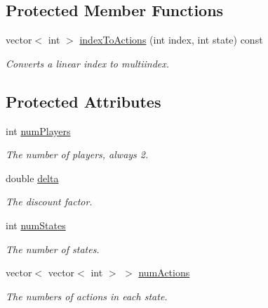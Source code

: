 \subsection*{Protected Member Functions}
\begin{DoxyCompactItemize}
\item 
vector$<$ int $>$ \hyperlink{classSGAbstractGame_a1b1ab8f6b09aaef481ba8eab5934ac66}{index\+To\+Actions} (int index, int state) const
\begin{DoxyCompactList}\small\item\em Converts a linear index to multiindex. \end{DoxyCompactList}\end{DoxyCompactItemize}
\subsection*{Protected Attributes}
\begin{DoxyCompactItemize}
\item 
\mbox{\label{classSGAbstractGame_aaa793d0ed9adcb2b2e11b999432bfae8}} 
int \hyperlink{classSGAbstractGame_aaa793d0ed9adcb2b2e11b999432bfae8}{num\+Players}
\begin{DoxyCompactList}\small\item\em The number of players, always 2. \end{DoxyCompactList}\item 
\mbox{\label{classSGAbstractGame_a34c8905ac463bb2ec54aba4eb4ac376f}} 
double \hyperlink{classSGAbstractGame_a34c8905ac463bb2ec54aba4eb4ac376f}{delta}
\begin{DoxyCompactList}\small\item\em The discount factor. \end{DoxyCompactList}\item 
\mbox{\label{classSGAbstractGame_a4d09150e3135b0abf07ae5319c12d1ef}} 
int \hyperlink{classSGAbstractGame_a4d09150e3135b0abf07ae5319c12d1ef}{num\+States}
\begin{DoxyCompactList}\small\item\em The number of states. \end{DoxyCompactList}\item 
vector$<$ vector$<$ int $>$ $>$ \hyperlink{classSGAbstractGame_a907a945ec0afb42dfeb164b4520879c5}{num\+Actions}
\begin{DoxyCompactList}\small\item\em The numbers of actions in each state. \end{DoxyCompactList}\end{DoxyCompactItemize}


